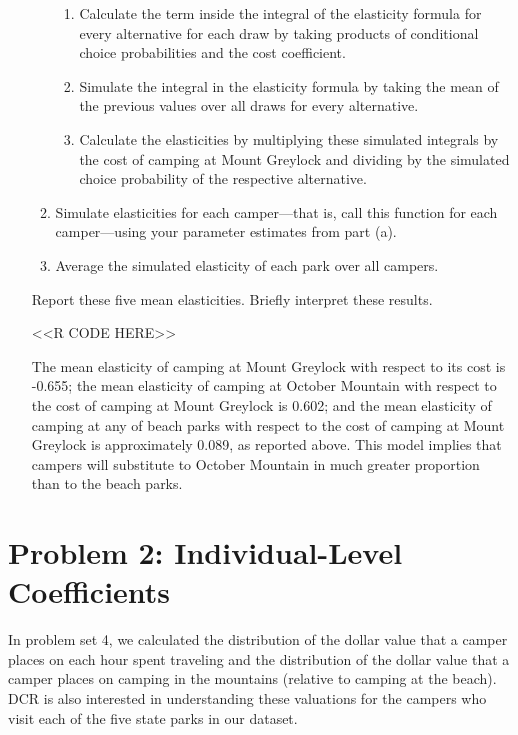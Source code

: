 \documentclass[11pt,letterpaper]{article}
\begin{document}
\begin{enumerate}[label=\alph*., leftmargin=*]
\begin{enumerate}[label=\Roman*.]
\begin{enumerate}[label=\roman*.]
			\item Calculate the term inside the integral of the elasticity formula for every alternative for each draw by taking products of conditional choice probabilities and the cost coefficient.
			\item Simulate the integral in the elasticity formula by taking the mean of the previous values over all draws for every alternative.
			\item Calculate the elasticities by multiplying these simulated integrals by the cost of camping at Mount Greylock and dividing by the simulated choice probability of the respective alternative.
		\end{enumerate}
		\item Simulate elasticities for each camper---that is, call this function for each camper---using your parameter estimates from part (a).
		\item Average the simulated elasticity of each park over all campers.
	\end{enumerate}
	Report these five mean elasticities. Briefly interpret these results.

	<<R CODE HERE>>

	The mean elasticity of camping at Mount Greylock with respect to its cost is -0.655; the mean elasticity of camping at October Mountain with respect to the cost of camping at Mount Greylock is 0.602; and the mean elasticity of camping at any of beach parks with respect to the cost of camping at Mount Greylock is approximately 0.089, as reported above. This model implies that campers will substitute to October Mountain in much greater proportion than to the beach parks.
\end{enumerate}

\section*{Problem 2: Individual-Level Coefficients}

In problem set 4, we calculated the distribution of the dollar value that a camper places on each hour spent traveling and the distribution of the dollar value that a camper places on camping in the mountains (relative to camping at the beach). DCR is also interested in understanding these valuations for the campers who visit each of the five state parks in our dataset. 
\end{document}
